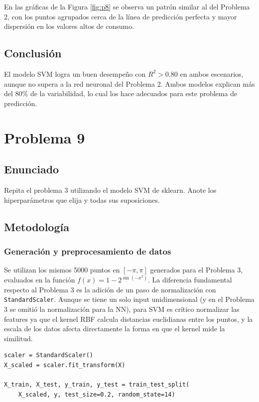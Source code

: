 \documentclass{article}
\begin{document}
En las gráficas de la Figura \ref{fig:p8} se observa un patrón similar al del Problema 2, con los puntos agrupados cerca de la línea de predicción perfecta y mayor dispersión en los valores altos de consumo.

\subsection{Conclusión}

El modelo SVM logra un buen desempeño con $R^2 > 0.80$ en ambos escenarios, aunque no supera a la red neuronal del Problema 2. Ambos modelos explican más del 80\% de la variabilidad, lo cual los hace adecuados para este problema de predicción.

\section{Problema 9}

\subsection{Enunciado}

Repita el problema 3 utilizando el modelo SVM de sklearn. Anote los hiperparámetros que elija y todas sus suposiciones.

\subsection{Metodología}

\subsubsection{Generación y preprocesamiento de datos}

Se utilizan los mismos 5000 puntos en $[-\pi, \pi]$ generados para el Problema 3, evaluados en la función $f(x) = 1 - 2^{\sin(-x^2)}$. La diferencia fundamental respecto al Problema 3 es la adición de un paso de normalización con \texttt{StandardScaler}. Aunque se tiene un solo input unidimensional (y en el Problema 3 se omitió la normalización para la NN), para SVM es crítico normalizar las features ya que el kernel RBF calcula distancias euclidianas entre los puntos, y la escala de los datos afecta directamente la forma en que el kernel mide la similitud.

\begin{lstlisting}
scaler = StandardScaler()
X_scaled = scaler.fit_transform(X)

X_train, X_test, y_train, y_test = train_test_split(
    X_scaled, y, test_size=0.2, random_state=14)
\end{lstlisting}
\end{document}
